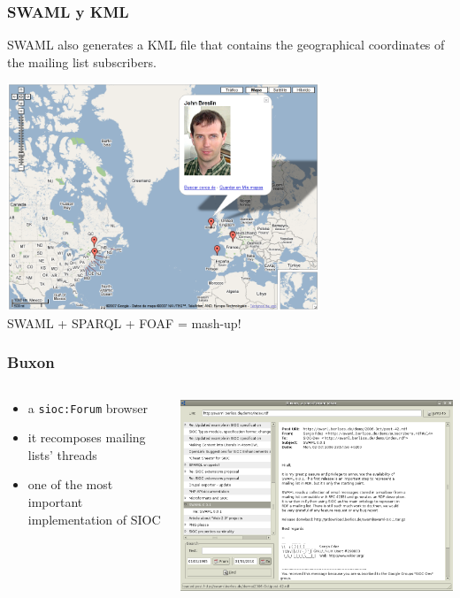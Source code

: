 \documentclass[spanish,notes=hide]{beamer}
\begin{document}
\frame
{
  \frametitle{SWAML y KML}

  SWAML also generates a KML file that contains the geographical coordinates 
  of the mailing list subscribers.

  \begin{center}
    \includegraphics[width=0.7\textwidth]{images/googlemaps.png}\\
    SWAML + SPARQL + FOAF = mash-up!
  \end{center}
}
\frame
{
  \frametitle{Buxon}

  \begin{columns}
   \begin{column}{0.32\textwidth}
	\begin{itemize}
	  \item a \texttt{sioc:Forum} browser
	  \item it recomposes mailing lists' threads
	  \item one of the most important implementation of SIOC
	\end{itemize}
   \end{column}
   \begin{column}{0.68\textwidth}
	\includegraphics[width=\textwidth]{images/buxon.png}
   \end{column}
  \end{columns}
}
\end{document}
